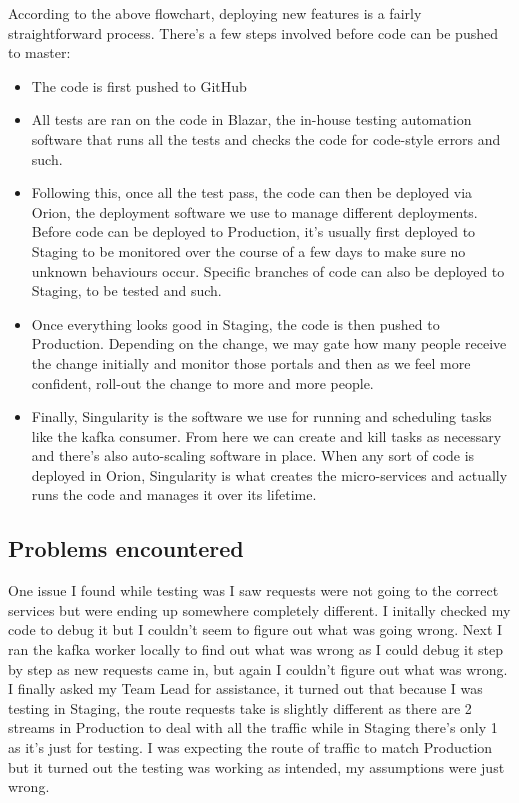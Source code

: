 According to the above flowchart, deploying new features is a fairly straightforward process. There's a few steps involved before code can be pushed to master: 
\begin{itemize}
\item The code is first pushed to GitHub
\item All tests are ran on the code in Blazar, the in-house testing automation software that runs all the tests and checks the code for code-style errors and such.
\item Following this, once all the test pass, the code can then be deployed via Orion, the deployment software we use to manage different deployments. Before code can be deployed to Production, it's usually first deployed to Staging to be monitored over the course of a few days to make sure no unknown behaviours occur. Specific branches of code can also be deployed to Staging, to be tested and such.
\item Once everything looks good in Staging, the code is then pushed to Production. Depending on the change, we may gate how many people receive the change initially and monitor those portals and then as we feel more confident, roll-out the change to more and more people. 
\item Finally, Singularity is the software we use for running and scheduling tasks like the kafka consumer. From here we can create and kill tasks as necessary and there's also auto-scaling software in place. When any sort of code is deployed in Orion, Singularity is what creates the micro-services and actually runs the code and manages it over its lifetime. 
\end{itemize}
\subsection{Problems encountered}
One issue I found while testing was I saw requests were not going to the correct services but were ending up somewhere completely different.  I initally checked my code to debug it but I couldn't seem to figure out what was going wrong.  Next I ran the kafka worker locally to find out what was wrong as I could debug it step by step as new requests came in, but again I couldn't figure out what was wrong.  I finally asked my Team Lead for assistance,  it turned out that because I was testing in Staging,  the route requests take is slightly different as there are 2 streams in Production to deal with all the traffic while in Staging there's only 1 as it's just for testing.  I was expecting the route of traffic to match Production but it turned out the testing was working as intended,  my assumptions were just wrong. 

